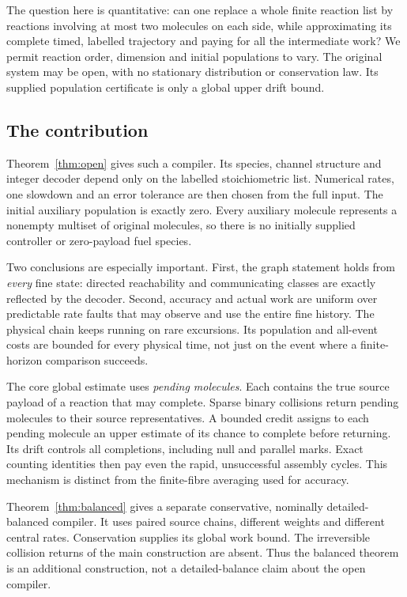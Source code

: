 \documentclass[11pt,reqno]{amsart}
\theoremstyle{definition}
\theoremstyle{remark}
\begin{document}
The question here is quantitative: can one replace a whole finite reaction
list by reactions involving at most two molecules on each side, while
approximating its complete timed, labelled trajectory and paying for all the
intermediate work? We permit reaction order, dimension and initial populations
to vary. The original system may be open, with no stationary distribution or
conservation law. Its supplied population certificate is only a global upper
drift bound.

\subsection{The contribution}
Theorem~\ref{thm:open} gives such a compiler. Its species, channel structure and
integer decoder depend only on the labelled stoichiometric list. Numerical
rates, one slowdown and an error tolerance are then chosen from the full input.
The initial auxiliary population is exactly zero. Every auxiliary molecule
represents a nonempty multiset of original molecules, so there is no initially
supplied controller or zero-payload fuel species.

Two conclusions are especially important. First, the graph statement holds
from \emph{every} fine state: directed reachability and communicating classes
are exactly reflected by the decoder. Second, accuracy and actual work are
uniform over predictable rate faults that may observe and use the entire fine
history. The physical chain keeps running on rare excursions. Its population
and all-event costs are bounded for every physical time, not just on the event
where a finite-horizon comparison succeeds.

The core global estimate uses \emph{pending molecules}. Each contains the true
source payload of a reaction that may complete. Sparse binary collisions return
pending molecules to their source representatives. A bounded credit assigns to
each pending molecule an upper estimate of its chance to complete before
returning. Its drift controls all completions, including null and parallel
marks. Exact counting identities then pay even the rapid, unsuccessful assembly
cycles. This mechanism is distinct from the finite-fibre averaging used for
accuracy.

Theorem~\ref{thm:balanced} gives a separate conservative, nominally
detailed-balanced compiler. It uses paired source chains, different weights and
different central rates. Conservation supplies its global work bound. The
irreversible collision returns of the main construction are absent. Thus the
balanced theorem is an additional construction, not a detailed-balance claim
about the open compiler.
\end{document}
